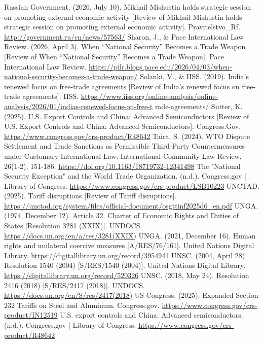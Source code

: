 \begin{referencelist}
   Russian Government. (2026, July 10). Mikhail Mishustin holds strategic session on promoting external economic activity [Review of Mikhail Mishustin holds strategic session on promoting external economic activity]. Pravitelstvo\_Rf. \url{http://government.ru/en/news/57563/}
   Sharon, J., \& Pace International Law Review. (2026, April 3). When “National Security” Becomes a Trade Weapon [Review of When “National Security” Becomes a Trade Weapon]. Pace International Law Review. \url{https://pilr.blogs.pace.edu/2026/04/03/when-national-security-becomes-a-trade-weapon/}
   Solanki, V., \& IISS. (2019). India’s renewed focus on free-trade agreements [Review of India’s renewed focus on free-trade agreements]. IISS. \url{https://www.iiss.org/online-analysis/online-analysis/2026/01/indias-renewed-focus-on-free-t} rade-agreements/
   Sutter, K. (2025). U.S. Export Controls and China: Advanced Semiconductors [Review of U.S. Export Controls and China: Advanced Semiconductors]. Congress.Gov. \url{https://www.congress.gov/crs-product/R48642}
   Taira, S. (2024). WTO Dispute Settlement and Trade Sanctions as Permissible Third-Party Countermeasures under Customary International Law. International Community Law Review, 26(1-2), 151-186. \url{https://doi.org/10.1163/18719732-12341498}
   The "National Security Exception" and the World Trade Organization. (n.d.). Congress.gov | Library of Congress. \url{https://www.congress.gov/crs-product/LSB10223}
   UNCTAD. (2025). Tariff disruptions [Review of Tariff disruptions]. \url{https://unctad.org/system/files/official-document/osgttinf2025d6_en.pdf}
   UNGA. (1974, December 12). Article 32. Charter of Economic Rights and Duties of States [Resolution 3281 (XXIX)]. UNDOCS. \url{https://docs.un.org/en/a/res/3281(XXIX)}
   UNGA. (2021, December 16). Human rights and unilateral coercive measures [A/RES/76/161]. United Nations Digital Library. \url{https://digitallibrary.un.org/record/3954941}
   UNSC. (2004, April 28). Resolution 1540 (2004) [S/RES/1540 (2004)]. United Nations Digital Library. \url{https://digitallibrary.un.org/record/520326}
   UNSC. (2018, May 24). Resolution 2416 (2018) [S/RES/2417 (2018)]. UNDOCS. \url{https://docs.un.org/en/S/res/2417(2018)}
   US Congress. (2025). Expanded Section 232 Tariffs on Steel and Aluminum. Congress.gov. \url{https://www.congress.gov/crs-product/IN12519}
   U.S. export controls and China: Advanced semiconductors. (n.d.). Congress.gov | Library of Congress. \url{https://www.congress.gov/crs-product/R48642}

\end{referencelist}
